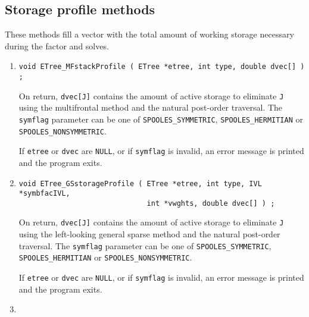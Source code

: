 \subsection{Storage profile methods}
\label{subsection:ETree:proto:storage}
\par
These methods fill a vector with the total amount of working
storage necessary during the factor and solves.
\par
\begin{enumerate}
\item
\begin{verbatim}
void ETree_MFstackProfile ( ETree *etree, int type, double dvec[] ) ;
\end{verbatim}
\par
On return, {\tt dvec[J]} contains the amount of active storage to
eliminate {\tt J} using the multifrontal method and the natural
post-order traversal.
The {\tt symflag} parameter can be one of {\tt SPOOLES\_SYMMETRIC},
{\tt SPOOLES\_HERMITIAN} or {\tt SPOOLES\_NONSYMMETRIC}.
\par {}
If {\tt etree} or {\tt dvec} are {\tt NULL}, 
or if {\tt symflag} is invalid,
an error message is printed and the program exits.
\item
\begin{verbatim}
void ETree_GSstorageProfile ( ETree *etree, int type, IVL *symbfacIVL,
                              int *vwghts, double dvec[] ) ;
\end{verbatim}
\par
On return, {\tt dvec[J]} contains the amount of active storage to
eliminate {\tt J} using the left-looking general sparse method 
and the natural post-order traversal.
The {\tt symflag} parameter can be one of {\tt SPOOLES\_SYMMETRIC},
{\tt SPOOLES\_HERMITIAN} or {\tt SPOOLES\_NONSYMMETRIC}.
\par {}
If {\tt etree} or {\tt dvec} are {\tt NULL}, 
or if {\tt symflag} is invalid,
an error message is printed and the program exits.
\item
\begin{verbatim}

\end{verbatim}
\end{enumerate}
